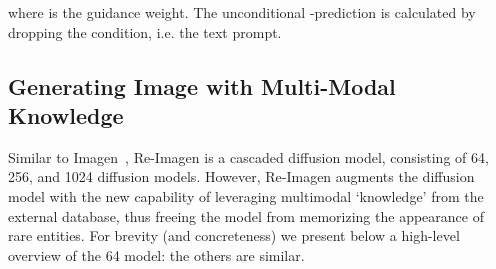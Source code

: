 \documentclass{article} \usepackage{iclr2023_conference,times}
\newcommand{\modelname}{{Re-Imagen}\xspace}
\begin{document}
where  is the guidance weight. The unconditional -prediction  is calculated by dropping the condition, i.e. the text prompt.

\subsection{Generating Image with Multi-Modal Knowledge}

Similar to Imagen~\citep{saharia2022photorealistic},  \modelname is a cascaded diffusion model, consisting of 64, 256, and 1024 diffusion models. However, \modelname augments the diffusion model with the new capability of leveraging multimodal `knowledge' from the external database, thus freeing the model from memorizing the appearance of rare entities. For brevity (and concreteness) we present below a  high-level overview of the 64 model: the others are similar.
\end{document}
